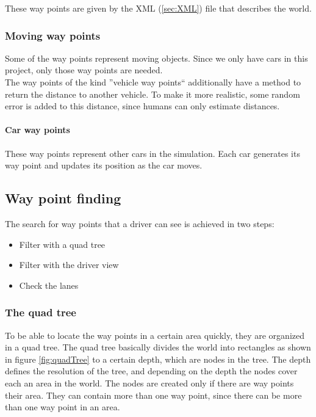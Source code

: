 These way points are given by the XML (\ref{sec:XML}) file that describes the 
world.

\subsubsection{Moving way points}

Some of the way points represent moving objects. Since we only have cars in this
project, only those way points are needed. \\

\label{par:movingWPDistance}
The way points of the kind ''vehicle way points`` additionally have a method to 
return the distance to another vehicle. To make it more realistic, some random 
error is added to this distance, since humans can only estimate distances.

\paragraph{Car way points}

These way points represent other cars in the simulation. Each car generates its
way point and updates its position as the car moves.

\subsection{Way point finding}

The search for way points that a driver can see is achieved in two steps:

\begin{itemize}
\item Filter with a quad tree
\item Filter with the driver view
\item Check the lanes
\end{itemize}


\subsubsection{The quad tree}
\label{sec:quadTree}

To be able to locate the way points in a certain area quickly, they are 
organized in a quad tree. The quad tree basically divides the world into 
rectangles as shown in figure \ref{fig:quadTree} to a certain depth, which are 
nodes in the tree. The depth defines the resolution of the tree, and depending
on the depth the nodes cover each an area in the world. The nodes 
are created only if there are way points their area. They can contain
more than one way point, since there can be more than one way point in an 
area.\\

